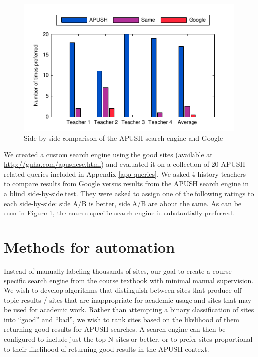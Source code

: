 \documentclass[pdfpagelabels=false,plainpages=true]{acm_proc_article-sp}
\begin{document}
\begin{figure}
\includegraphics{teacher_eval}
\caption{Side-by-side comparison of the APUSH search engine and Google}
\label{fig-eval}
\end{figure}

We created a custom search engine using the good sites (available at
\url{http://guha.com/apushcse.html}) and evaluated it on a collection of 20
APUSH-related queries included in Appendix \ref{app-queries}.
We asked 4 history teachers to compare results from Google versus results
from the APUSH search engine in a blind side-by-side test. They were asked
to assign one of the following ratings to each side-by-side: side A/B is better,
side A/B are about the same. As can be seen in Figure \ref{fig-eval}, the
course-specific search engine is substantially preferred. 

\section{Methods for automation}

Instead of manually labeling thousands of sites, our goal to create a course-specific search engine from 
the course textbook with minimal manual supervision. We wish to develop algorithms that distinguish
between sites that produce off-topic results / sites that are inappropriate for 
academic usage and sites that may be used for academic work.  Rather than
attempting a binary classification of sites into ``good'' and ``bad'', we wish
to rank sites based on the likelihood of them returning good results for APUSH
searches. A search engine can then be configured to include just the top N sites
or better, or to prefer sites proportional to their likelihood of returning good
results in the APUSH context.
\end{document}
